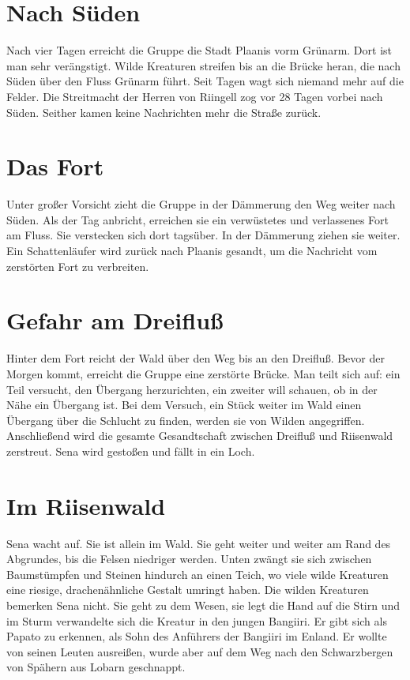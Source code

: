 \documentclass[12pt,a4paper,onecolumn,twoside,ngerman]{book}
\newcommand{\Sena}{Sena}
\newcommand{\Bangiri}{Bangiiri}
\newcommand{\Papato}{Papato}
\newcommand{\Enland}{Enland}
\newcommand{\Schattenlaufer}{Schattenläufer}
\newcommand{\Lobarn}{Lobarn}
\newcommand{\Rhingell}{Riingell}
\newcommand{\Dreifluss}{Dreifluß}
\newcommand{\Planis}{Plaanis}
\newcommand{\Grunarm}{Grünarm}
\newcommand{\Grunland}{Grünland}
\newcommand{\Riesenwald}{Riisenwald}
\begin{document}
{\section{Nach Süden}
Nach vier Tagen erreicht die Gruppe die Stadt {\Planis} vorm {\Grunarm}. Dort ist man sehr verängstigt. Wilde Kreaturen streifen bis an die Brücke heran, die nach Süden über den Fluss {\Grunarm} führt. Seit Tagen wagt sich niemand mehr auf die Felder. Die Streitmacht der Herren von {\Rhingell} zog vor 28 Tagen vorbei nach Süden. Seither kamen keine Nachrichten mehr die Straße zurück.
 
\section{Das Fort}
Unter großer Vorsicht zieht die Gruppe in der Dämmerung den Weg weiter nach Süden.\linebreak
Als der Tag anbricht, erreichen sie ein verwüstetes und verlassenes Fort am Fluss. Sie verstecken sich dort tagsüber. In der Dämmerung ziehen sie weiter. Ein  {\Schattenlaufer} wird zurück nach {\Planis} gesandt, um die Nachricht vom zerstörten Fort zu verbreiten.

\section{Gefahr am \Dreifluss}
Hinter dem Fort reicht der Wald über den Weg bis an den {\Dreifluss}. Bevor der Morgen kommt, erreicht die Gruppe eine zerstörte Brücke.\linebreak
Man teilt sich auf: ein Teil versucht, den Übergang herzurichten, ein zweiter will schauen, ob in der Nähe ein Übergang ist. Bei dem Versuch, ein Stück weiter im Wald einen Übergang über die Schlucht zu finden, werden sie von Wilden angegriffen. Anschließend wird die gesamte Gesandtschaft zwischen {\Dreifluss} und {\Riesenwald} zerstreut.  {\Sena} wird gestoßen und fällt in ein Loch.

\section{Im \Riesenwald}
{\Sena} wacht auf. Sie ist allein im Wald. Sie geht weiter und weiter am Rand des Abgrundes, bis die Felsen niedriger werden. Unten zwängt sie sich zwischen Baumstümpfen und Steinen hindurch an einen Teich, wo viele wilde Kreaturen eine riesige, drachenähnliche Gestalt umringt haben.\linebreak
Die wilden Kreaturen bemerken {\Sena} nicht. Sie geht zu dem Wesen, sie legt die Hand auf die Stirn und im Sturm verwandelte sich die Kreatur in den jungen {\Bangiri}. Er gibt sich als {\Papato} zu erkennen, als Sohn des Anführers der {\Bangiri} im {\Enland}. Er wollte von seinen Leuten ausreißen, wurde aber auf dem Weg nach den Schwarzbergen von Spähern aus {\Lobarn} geschnappt. 

}
\end{document}
